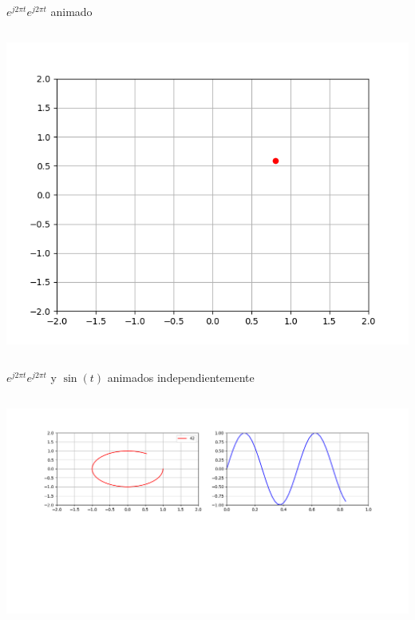 \begin{frame}{$e^{j2\pi t}$}{$e^{j2\pi t}$ animado }
   \handsonicon
   \begin{columns}[onlytextwidth]
      
      \centering\includegraphics[width=1.0\textwidth]{2_clase/euler1}
   \end{columns}
   \vfill
\end{frame}
\begin{frame}{$e^{j2\pi t}$}{$e^{j2\pi t}$ y $\sin(t)$ animados independientemente}
   \handsonicon
   \begin{columns}[onlytextwidth]
      
      \centering\includegraphics[width=1.0\textwidth]{2_clase/euler2}
   \end{columns}
   \vfill
\end{frame}
